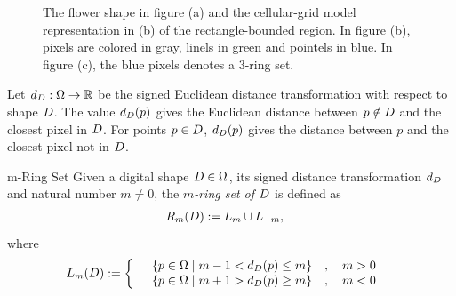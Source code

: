 \begin{figure}[]
{	}\hspace{40pt}%
	\caption{The flower shape in figure (a) and the cellular-grid model representation in (b) of the rectangle-bounded region. In figure (b), pixels are colored in gray, linels in green and pointels in blue. In figure (c), the blue pixels denotes a $3$-ring set.}
	\label{fig:cellular-grid-model}
\end{figure}

Let $d_{D}:\Omega \rightarrow \mathbb{R}$ be the signed Euclidean distance transformation with respect to shape $D$. The value $d_{D}(p)$ gives the Euclidean distance between $p \notin D$ and the closest pixel in $D$. For points $p \in D$, $d_{D}(p)$ gives the distance between $p$ and the closest pixel not in $D$.

\begin{definition}{m-Ring Set}
Given a digital shape $D \in\Omega$, its signed distance transformation $d_{D}$ and natural number $m \neq 0$, the {\em $m$-ring set of $D$} is defined as
\begin{align*}
	R_m(D) &:= L_m \cup L_{-m},
\end{align*}
where
\begin{align*}
	L_m(D) &:= \left\{ \quad \begin{array}{cc}
		\left\{ p \in \Omega \; | \; m-1 < d_{D}(p) \leq m \right\} & , \quad m>0\\
		\left\{ p \in \Omega \; | \; m+1 > d_{D}(p) \geq m \right\} & , \quad m<0
		\end{array} \right.
\end{align*}
\end{definition}


